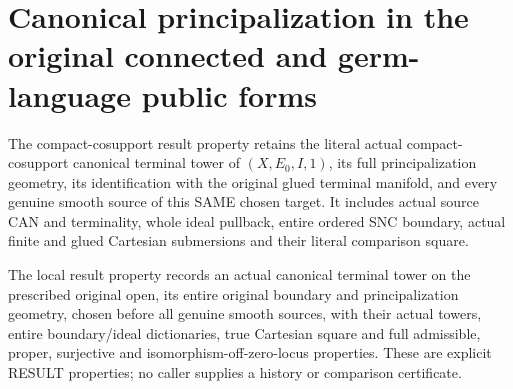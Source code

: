\section{Canonical principalization in the original connected and germ-language public forms}
\label{sec:hironaka-original-canonical-principalization-specializations}

\begin{definition}
\label{hir:original-principalization-public-canonical-result}
The compact-cosupport result property retains the literal actual
compact-cosupport canonical terminal tower of $(X,E_0,I,1)$, its full
principalization geometry, its identification with the original glued
terminal manifold, and every genuine smooth source of this SAME
chosen target. It includes actual source CAN and terminality, whole
ideal pullback, entire ordered SNC boundary, actual finite and glued
Cartesian submersions and their literal comparison square.

The local result property records an actual canonical terminal tower
on the prescribed original open, its entire original boundary and
principalization geometry, chosen before all genuine smooth sources,
with their actual towers, entire boundary/ideal dictionaries, true
Cartesian square and full admissible, proper, surjective and
isomorphism-off-zero-locus properties. These are explicit RESULT
properties; no caller supplies a history or comparison certificate.
\leanok
\end{definition}

